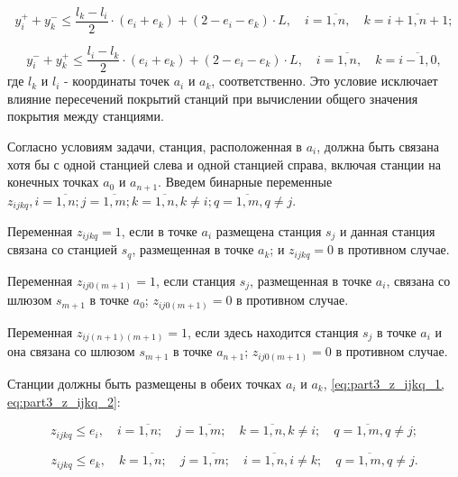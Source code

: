 \begin{equation}
  \label{eq:part3_yi_3}
  y_i^+ + y_k^- \leq \frac{l_k - l_i}{2} \cdot (e_i + e_k ) + (2 - e_i - e_k ) \cdot L, \quad i = \overline{1,n},  \quad k = \overline{i+1,n+1};
\end{equation}

\begin{equation}
  \label{eq:part3_yi_4}
  y_i^- + y_k^+  \leq \frac{l_i-l_k}{2} \cdot (e_i + e_k) + (2 - e_i - e_k) \cdot L, \quad i = \overline{1,n}, \quad k = \overline{i-1,0},
\end{equation}
где $ l_k $ и $ l_i $ - координаты точек $ a_i $ и $ a_k $, соответственно. Это условие исключает влияние пересечений покрытий станций при вычислении общего значения покрытия между станциями.

Согласно условиям задачи, станция, расположенная в $ a_i $, должна быть связана хотя бы с одной станцией слева и одной станцией справа, включая станции на конечных точках $ a_0 $ и $a_{n + 1}$. Введем бинарные переменные $z_{ijkq}, i = \overline{1,n}; j= \overline{1,m}; k=\overline{1,n},  k \neq i; q= \overline{1,m}, q \neq j$.

Переменная $ z_ {ijkq} = 1$, если в точке $ a_i $ размещена станция $ s_j $ и данная станция связана со станцией $ s_q $, размещенная в точке $ a_k $; и $ z_ {ijkq} = 0 $ в противном случае.

Переменная $ z_{ij0(m + 1)} = 1$, если станция $ s_j $, размещенная в точке $ a_i $, связана со шлюзом $ s_{m + 1} $ в точке $ a_0 $; $ z_{ij0 (m + 1)} = 0 $ в противном случае.
 
Переменная $ z_{ij(n + 1)(m + 1)} = 1 $, если здесь находится станция $ s_j $ в точке $ a_i $ и она связана со шлюзом $ s_{m + 1} $ в точке $ a_{n + 1} $; $ z_{ij0(m + 1)} = 0 $  в противном случае.

Станции должны быть размещены в обеих точках $ a_i $ и $ a_k $, \cref{eq:part3_z_ijkq_1, eq:part3_z_ijkq_2}:

\begin{equation}
  \label{eq:part3_z_ijkq_1}
  z_{ijkq} \leq e_i , \quad i = \overline{1, n}; \quad j = \overline{1, m}; \quad k = \overline{1,n}, k \neq i; \quad q = \overline{1,m}, q \neq j;
\end{equation}


\begin{equation}
  \label{eq:part3_z_ijkq_2}
  z_{ijkq} \leq e_k , \quad k = \overline{1, n}; \quad j = \overline{1, m}; \quad i = \overline{1,n}, i \neq k; \quad q = \overline{1,m}, q \neq j.
\end{equation}

